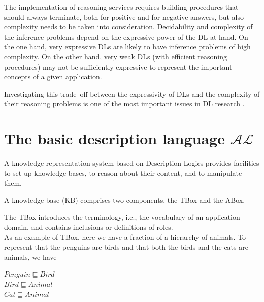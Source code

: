 \documentclass[a4paper, 11pt, oneside]{duthesis}
\newcommand{\al}{\mathcal{AL}}
\begin{document}
The implementation of reasoning services requires building procedures that should always terminate, both for positive and for negative answers, but also complexity needs to be taken into consideration.
Decidability and complexity of the inference problems depend on the expressive power of the DL at hand.
On the one hand, very expressive DLs are likely to have inference problems of high complexity.
On the other hand, very weak DLs (with efficient reasoning procedures) may not be sufficiently expressive to represent the important concepts of a given application.

Investigating this trade--off between the expressivity of DLs and the complexity of their reasoning problems is one of the most important issues in DL research
\cite{Baader:2003:BDL:885746.885749}.


\newpage


%
%

\section{The basic description language $\al$}
A knowledge representation system based on Description Logics provides facilities to set up knowledge bases, to reason about their content, and to manipulate them.

A knowledge base (KB) comprises two components, the TBox and the ABox.

The TBox introduces the terminology, i.e., the vocabulary of an application domain, and contains inclusions or definitions of roles.\\[.2cm]
As an example of TBox, here we have a fraction of a hierarchy of animals. To represent that the penguins are birds and that both the birds and the cats are animals, we have
\begin{center}
$Penguin \sqsubseteq Bird$\\
$Bird \sqsubseteq Animal$\\
$Cat \sqsubseteq Animal$
\end{center}
\end{document}
